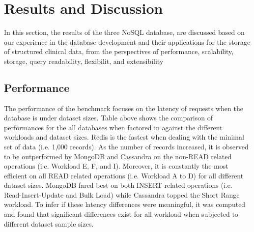 \documentclass[5p]{elsarticle}
\begin{document}
\section{Results and Discussion}

\paragraph{} In this section, the results of the three NoSQL database, 
are discussed based on our experience in the database development and their applications for the storage of structured clinical data, 
from the perspectives of performance, scalability, storage, query readability, flexibilit, and extensibility


\subsection{Performance}
The performance of the benchmark focuses on the latency of requests when the database is under dataset sizes.
Table above shows the comparison of performances for the all databases when factored in against the different workloads and dataset sizes. 
Redis is the fastest when dealing with the minimal set of data (i.e. 1,000 records). 
As the number of records increased, it is observed to be outperformed by MongoDB and Cassandra on the non-READ related operations (i.e. Workload E, F, and I).  
Moreover, it is constantly the most efficient on all READ related operations (i.e. Workload A to D) for all different dataset sizes. 
MongoDB fared best on both INSERT related operations (i.e. Read-Insert-Update and Bulk Load) while Cassandra topped the Short Range workload. 
To infer if these latency differences were meaningful, it was computed and found that significant differences 
exist for all workload when subjected to different dataset sample sizes. 
\end{document}

